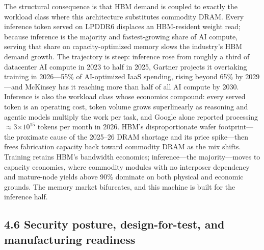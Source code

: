 \documentclass[12pt,onecolumn]{article}
\begin{document}
The structural consequence is that HBM demand is coupled to exactly the workload class where this architecture substitutes commodity DRAM. Every inference token served on LPDDR6 displaces an HBM-resident weight read; because inference is the majority and fastest-growing share of AI compute\cite{21,22,23}, serving that share on capacity-optimized memory slows the industry's HBM demand growth. The trajectory is steep: inference rose from roughly a third of datacenter AI compute in 2023 to half in 2025\cite{21}, Gartner projects it overtaking training in 2026---55\% of AI-optimized IaaS spending, rising beyond 65\% by 2029\cite{22}---and McKinsey has it reaching more than half of all AI compute by 2030\cite{23}. Inference is also the workload class whose economics compound: every served token is an operating cost, token volume grows superlinearly as reasoning and agentic models multiply the work per task, and Google alone reported processing $\approx$3$\times10^{15}$ tokens per month in 2026\cite{24}. HBM's disproportionate wafer footprint---the proximate cause of the 2025--26 DRAM shortage and its price spike\cite{25}---then frees fabrication capacity back toward commodity DRAM as the mix shifts. Training retains HBM's bandwidth economics; inference---the majority---moves to capacity economics, where commodity modules with no interposer dependency and mature-node yields above 90\% dominate on both physical and economic grounds. The memory market bifurcates, and this machine is built for the inference half.

\subsection*{4.6 Security posture, design-for-test, and manufacturing readiness}\label{sec:4.6}
\end{document}
